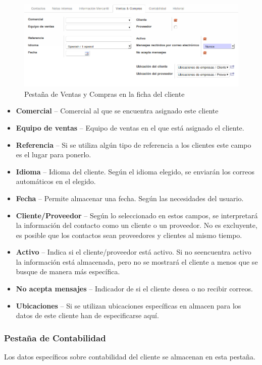 \begin{figure}[H]
\includegraphics[width=\textwidth]{ventas/img/ven_cliventas.png}
\caption{Pestaña de Ventas y Compras en la ficha del cliente}
\label{ven:cliventas}
\end{figure}

\begin{itemize}
  \item \textbf{Comercial} -- Comercial al que se encuentra asignado este cliente
  \item \textbf{Equipo de ventas} -- Equipo de ventas en el que está asignado el cliente.
  \item \textbf{Referencia} -- Si se utiliza algún tipo de referencia a los clientes
        este campo es el lugar para ponerlo.
  \item \textbf{Idioma} -- Idioma del cliente. Según el idioma elegido, se enviarán los correos automáticos
        en el elegido.
  \item \textbf{Fecha} -- Permite almacenar una fecha. Según las necesidades del usuario.
  \item \textbf{Cliente/Proveedor} -- Según lo seleccionado en estos campos, se interpretará la información
        del contacto como un cliente o un proveedor. No es excluyente, es posible que los contactos sean
        proveedores y clientes al mismo tiempo.
  \item \textbf{Activo} -- Indica si el cliente/proveedor está activo. Si no seencuentra activo
        la información está almacenada, pero no se mostrará el cliente a menos que se busque de manera más
        específica.
  \item \textbf{No acepta mensajes} -- Indicador de si el cliente desea o no recibir correos.
  \item \textbf{Ubicaciones} -- Si se utilizan ubicaciones específicas en almacen para los datos de este cliente
        han de especificarse aquí.
\end{itemize}


\subsubsection{Pestaña de Contabilidad}
Los datos específicos sobre contabilidad del cliente se almacenan en esta pestaña.

